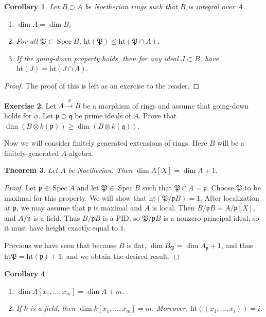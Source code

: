 \documentclass[leqno, openany]{memoir}
\newtheorem{thm}{Theorem}[section]
\newtheorem{cor}[thm]{Corollary}
\theoremstyle{definition}
\newtheorem{exer}[thm]{Exercise}
\theoremstyle{remark}
\theoremstyle{plain}
\theoremstyle{definition}
\theoremstyle{remark}
\newcommand{\mf}[1]{\mathfrak{#1}}
\newcommand{\mr}[1]{\mathrm{#1}}
\DeclareMathOperator{\Spec}{Spec}
\begin{document}
\begin{cor} Let $B \supset A$ be Noetherian rings such that $B$ is integral
    over $A$.  \begin{enumerate} \item $\dim A = \dim B$; \item For all $\mf{P}
        \in \Spec B$, $\mr{ht}(\mf{P}) \leq \mr{ht}(\mf{P} \cap A)$.  \item If
        the going-down property holds, then for any ideal $J \subset B$, have
        $\mr{ht}(J) = \mr{ht}(J \cap A)$.  \end{enumerate} \end{cor}

\begin{proof} The proof of this is left as an exercise to the reader.
\end{proof}

\begin{exer} Let $A \xrightarrow{\phi} B$ be a morphism of rings and assume
that going-down holds for $\phi$. Let $\mf{p} \supset \mf{q}$ be prime ideals
of $A$. Prove that $\dim(B \otimes k(\mf{p})) \geq \dim(B \otimes k(\mf{q}))$.
\end{exer}

Now we will consider finitely generated extensions of rings. Here $B$ will be a
finitely-generated $A$-algebra.

\begin{thm} Let $A$ be Noetherian. Then $\dim A[X] = \dim A + 1$.  \end{thm}

\begin{proof} Let $\mf{p} \in \Spec A$ and let $\mf{P} \in \Spec B$ such that
    $\mf{P} \cap A = \mf{p}$. Choose $\mf{P}$ to be maximal for this property.
    We will show that $\mr{ht}(\mf{P} / \mf{p}B) = 1$. After localization at
    $\mf{p}$, we may assume that $\mf{p}$ is maximal and $A$ is local. Then $B
    / \mf{p}B = A/\mf{p}[X]$, and $A / \mf{p}$ is a field. Thus $B / \mf{p}B$
    is a PID, so $\mf{P} / \mf{p}B$ is a nonzero principal ideal, so it must
    have height exactly equal to $1$.

    Previous we have seen that because $B$ is flat, $\dim B_{\mf{P}} = \dim
A_{\mf{p}} + 1$, and thus $\mr{ht}\mf{P} = \mr{ht}(\mf{p}) + 1$, and we obtain
the desired result.  \end{proof}

\begin{cor} \begin{enumerate} \item $\dim A[x_1, \ldots, x_m] = \dim A + m$.
\item If $k$ is a field, then $\dim k[x_1, \ldots, x_m] = m$. Moreover,
$\mr{ht}((x_1, \ldots, x_i)) = i$.  \end{enumerate} \end{cor}
\end{document}
